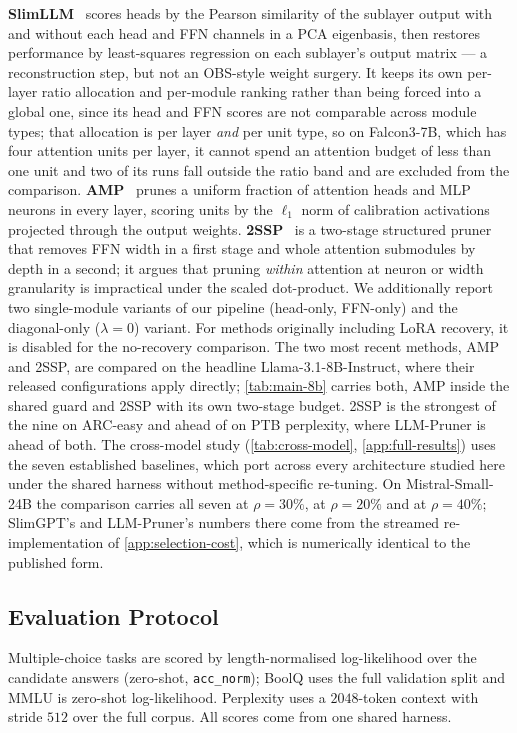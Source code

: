 \textbf{SlimLLM}~\citep{tang2025slimllm} scores heads by the Pearson similarity of the sublayer output
with and without each head and FFN channels in a PCA eigenbasis, then restores performance by
least-squares regression on each sublayer's output matrix --- a reconstruction step, but not an
OBS-style weight surgery. It keeps its own per-layer ratio allocation and per-module ranking rather than being forced into
a global one, since its head and FFN scores are not comparable across module types; that allocation is
per layer \emph{and} per unit type, so on Falcon3-7B, which has four attention units per layer, it
cannot spend an attention budget of less than one unit and two of its runs fall outside the ratio band
and are excluded from the comparison.
\textbf{AMP}~\citep{sultan2025amp} prunes a uniform fraction of attention heads and MLP neurons in
every layer, scoring units by the $\ell_1$ norm of calibration activations projected through the output
weights. \textbf{2SSP}~\citep{sandri2025twossp} is a two-stage structured pruner that removes FFN width
in a first stage and whole attention submodules by depth in a second; it argues that pruning
\emph{within} attention at neuron or width granularity is impractical under the scaled dot-product. We additionally
report two single-module variants of our pipeline (head-only, FFN-only) and the diagonal-only
($\lambda{=}0$) variant. For methods originally including LoRA recovery, it is disabled for the
no-recovery comparison. The two most recent methods, AMP and 2SSP, are compared
on the headline Llama-3.1-8B-Instruct, where their released configurations apply
directly; \cref{tab:main-8b} carries both, AMP inside the shared guard and 2SSP with its own two-stage
budget. 2SSP is the strongest of the nine on ARC-easy and ahead of \method on PTB perplexity, where
LLM-Pruner is ahead of both. The
cross-model study (\cref{tab:cross-model}, \cref{app:full-results}) uses the seven established
baselines, which port across every architecture studied here under the shared harness without
method-specific re-tuning. On Mistral-Small-24B the comparison carries all seven at
$\rho{=}30\%$, at $\rho{=}20\%$ and at $\rho{=}40\%$; SlimGPT's and
LLM-Pruner's numbers there come from the streamed re-implementation of \cref{app:selection-cost},
which is numerically identical to the published form.
\subsection{Evaluation Protocol}

\label{app:evalproto}
Multiple-choice tasks are scored by length-normalised log-likelihood over the candidate answers
(zero-shot, \texttt{acc\_norm}); BoolQ uses the full validation split and MMLU is zero-shot
log-likelihood. Perplexity uses a $2048$-token context with stride $512$ over the full corpus. All
scores come from one shared harness.


